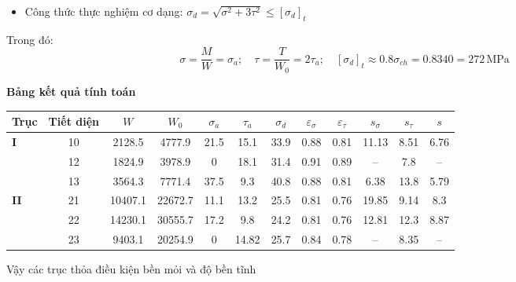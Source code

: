 \begin{itemize}
    \item Công thức thực nghiệm cơ dạng: $\sigma_d = \sqrt{\sigma^2 + 3\tau^2} \leq [\sigma_d]_t$
\end{itemize}

Trong đó:
\[
\sigma = \frac{M}{W} = \sigma_a; \quad \tau = \frac{T}{W_0} = 2\tau_a; \quad [\sigma_d]_t \approx 0.8\sigma_{ch} = 0.8340 = 272 \, \text{MPa}
\]

\textbf{Bảng kết quả tính toán}

\begin{center}
\begin{tabular}{|l|c|c|c|c|c|c|c|c|c|c|c|}
\hline
\textbf{Trục} & \textbf{Tiết diện} & $W$ & $W_0$ & $\sigma_a$ & $\tau_a$ & $\sigma_d$ & $\varepsilon_\sigma$ & $\varepsilon_\tau$ & $s_\sigma$ & $s_\tau$ & $s$ \\
\hline
\multirow{3}{*}{\textbf{I}} & 10 & 2128.5 & 4777.9 & 21.5 & 15.1 & 33.9 & 0.88 & 0.81 & 11.13 & 8.51 & 6.76 \\
\cline{2-12}
& 12 & 1824.9 & 3978.9 & 0 & 18.1 & 31.4 & 0.91 & 0.89 & -- & 7.8 & -- \\
\cline{2-12}
& 13 & 3564.3 & 7771.4 & 37.5 & 9.3 & 40.8 & 0.88 & 0.81 & 6.38 & 13.8 & 5.79 \\
\hline
\multirow{3}{*}{\textbf{II}} & 21 & 10407.1 & 22672.7 & 11.1 & 13.2 & 25.5 & 0.81 & 0.76 & 19.85 & 9.14 & 8.3 \\
\cline{2-12}
& 22 & 14230.1 & 30555.7 & 17.2 & 9.8 & 24.2 & 0.81 & 0.76 & 12.81 & 12.3 & 8.87 \\
\cline{2-12}
& 23 & 9403.1 & 20254.9 & 0 & 14.82 & 25.7 & 0.84 & 0.78 & -- & 8.35 & -- \\
\hline
\end{tabular}
\end{center}

Vậy các trục thỏa điều kiện bền mỏi và độ bền tĩnh
